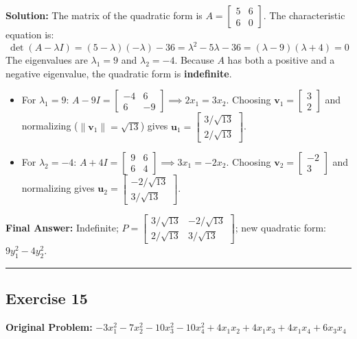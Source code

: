 \documentclass[11pt, letterpaper]{article}
\theoremstyle{definition}
\theoremstyle{remark}
\begin{document}
\textbf{Solution:}
The matrix of the quadratic form is $A = \begin{bmatrix} 5 & 6 \\ 6 & 0 \end{bmatrix}$.
The characteristic equation is:
\[
\det(A - \lambda I) = (5 - \lambda)(-\lambda) - 36 = \lambda^2 - 5\lambda - 36 = (\lambda - 9)(\lambda + 4) = 0
\]
The eigenvalues are $\lambda_1 = 9$ and $\lambda_2 = -4$. Because $A$ has both a positive and a negative eigenvalue, the quadratic form is \textbf{indefinite}.
\begin{itemize}
    \item For $\lambda_1 = 9$: $A - 9I = \begin{bmatrix} -4 & 6 \\ 6 & -9 \end{bmatrix} \implies 2x_1 = 3x_2$. Choosing $\mathbf{v}_1 = \begin{bmatrix} 3 \\ 2 \end{bmatrix}$ and normalizing ($\|\mathbf{v}_1\| = \sqrt{13}$) gives $\mathbf{u}_1 = \begin{bmatrix} 3/\sqrt{13} \\ 2/\sqrt{13} \end{bmatrix}$.
    \item For $\lambda_2 = -4$: $A + 4I = \begin{bmatrix} 9 & 6 \\ 6 & 4 \end{bmatrix} \implies 3x_1 = -2x_2$. Choosing $\mathbf{v}_2 = \begin{bmatrix} -2 \\ 3 \end{bmatrix}$ and normalizing gives $\mathbf{u}_2 = \begin{bmatrix} -2/\sqrt{13} \\ 3/\sqrt{13} \end{bmatrix}$.
\end{itemize}
\textbf{Final Answer:} Indefinite; $P = \begin{bmatrix} 3/\sqrt{13} & -2/\sqrt{13} \\ 2/\sqrt{13} & 3/\sqrt{13} \end{bmatrix}$; new quadratic form: $9y_1^2 - 4y_2^2$.

\medskip\hrule\medskip

\subsection*{Exercise 15}
\textbf{Original Problem:} $-3x_1^2 - 7x_2^2 - 10x_3^2 - 10x_4^2 + 4x_1x_2 + 4x_1x_3 + 4x_1x_4 + 6x_3x_4$
\end{document}
